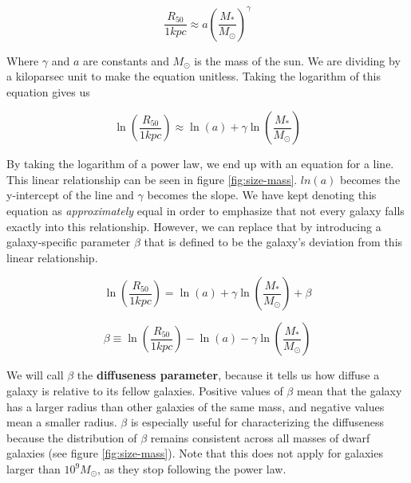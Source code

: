 \begin{equation}
    \frac{R_{50}}{1 kpc} \approx a
    \left(
        \frac{M_*}{M_\odot}
    \right)
    ^{\gamma}
\end{equation}

Where $\gamma$ and $a$ are constants and $M_\odot$ is the mass of the sun. We are dividing by a kiloparsec unit to make the equation unitless. Taking the logarithm of this equation gives us

\begin{equation}
    \ln \left(
        \frac{R_{50}}{1 kpc}
    \right)
    \approx
    \ln(a)
    + \gamma \ln \left(
        \frac{M_*}{M_\odot}
    \right)
\end{equation} \label{equ:linear-rel}

By taking the logarithm of a power law, we end up with an equation for a line. This linear relationship can be seen in figure \ref{fig:size-mass}. $ln(a)$ becomes the y-intercept of the line and $\gamma$ becomes the slope. We have kept denoting this equation as \emph{approximately} equal in order to emphasize that not every galaxy falls exactly into this relationship. However, we can replace that by introducing a galaxy-specific parameter $\beta$ that is defined to be the galaxy's deviation from this linear relationship.

\begin{equation}
    \ln \left(
        \frac{R_{50}}{1 kpc}
    \right)
    =
    \ln(a)
    + \gamma \ln \left(
        \frac{M_*}{M_\odot}
    \right)
    + \beta
\end{equation} \label{equ:log-log-with-beta}

\begin{equation}
    \beta
    \equiv
    \ln \left(
        \frac{R_{50}}{1 kpc}
    \right)
    -
    \ln(a)
    - \gamma \ln \left(
        \frac{M_*}{M_\odot}
    \right)
\end{equation} \label{equ:beta}

We will call $\beta$ the \textbf{diffuseness parameter}, because it tells us how diffuse a galaxy is relative to its fellow galaxies. Positive values of $\beta$ mean that the galaxy has a larger radius than other galaxies of the same mass, and negative values mean a smaller radius. $\beta$ is especially useful for characterizing the diffuseness because the distribution of $\beta$ remains consistent across all masses of dwarf galaxies (see figure \ref{fig:size-mass}). Note that this does not apply for galaxies larger than $10^9 M_\odot$, as they stop following the power law.

